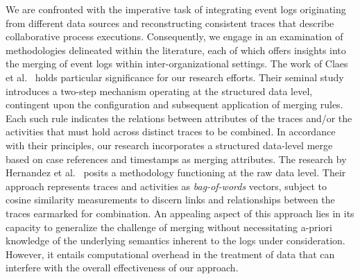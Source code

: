 We are confronted with the imperative task of integrating event logs originating from different data sources and reconstructing %
consistent traces that describe collaborative process executions.
Consequently, we engage in an examination of %
methodologies delineated within the literature, each of which offers insights into the merging of event logs within inter-organizational settings.
The work of Claes et al.~\cite{claes2014merging} holds particular significance for our research efforts. Their seminal study introduces a two-step mechanism operating at the structured data level, contingent upon the configuration and subsequent application of merging rules. Each such rule indicates %
the relations between attributes of the traces and/or the activities that must hold across %
distinct traces %
to be combined. %
In accordance with their principles, our research incorporates a structured data-level merge based on case references and timestamps as merging attributes. The research by Hernandez et al.~\cite{hernandez2021merging} posits a methodology functioning at the raw data level. Their approach represents traces and activities as \textit{bag-of-words} vectors, subject to cosine similarity measurements to discern links and relationships between the traces earmarked for combination. An appealing aspect of this approach lies in its capacity to generalize the challenge of merging without necessitating a-priori knowledge of the underlying semantics inherent to the logs under consideration. However, it entails computational overhead in the treatment of data that can interfere with the overall effectiveness of our approach. %





